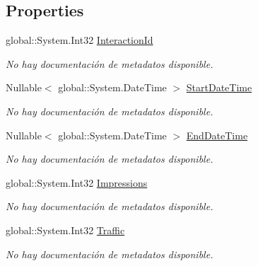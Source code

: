 \subsection*{Properties}
\begin{DoxyCompactItemize}
\item 
global\-::\-System.\-Int32 \hyperlink{class_game_memory_1_1_interactions_a1f644eb88ea4634d1760257a2017016a}{Interaction\-Id}
\begin{DoxyCompactList}\small\item\em No hay documentación de metadatos disponible. \end{DoxyCompactList}\item 
Nullable$<$ global\-::\-System.\-Date\-Time $>$ \hyperlink{class_game_memory_1_1_interactions_adba80b56aece549cdfe01fbe9f618371}{Start\-Date\-Time}
\begin{DoxyCompactList}\small\item\em No hay documentación de metadatos disponible. \end{DoxyCompactList}\item 
Nullable$<$ global\-::\-System.\-Date\-Time $>$ \hyperlink{class_game_memory_1_1_interactions_a7000d4b58dbf09624957b3868e754dd3}{End\-Date\-Time}
\begin{DoxyCompactList}\small\item\em No hay documentación de metadatos disponible. \end{DoxyCompactList}\item 
global\-::\-System.\-Int32 \hyperlink{class_game_memory_1_1_interactions_a34268d69790879d63853fb1ab5b72f21}{Impressions}
\begin{DoxyCompactList}\small\item\em No hay documentación de metadatos disponible. \end{DoxyCompactList}\item 
global\-::\-System.\-Int32 \hyperlink{class_game_memory_1_1_interactions_a3604b151ab46856b0bcb7156476cf279}{Traffic}
\begin{DoxyCompactList}\small\item\em No hay documentación de metadatos disponible. \end{DoxyCompactList}\item 

\end{DoxyCompactItemize}
